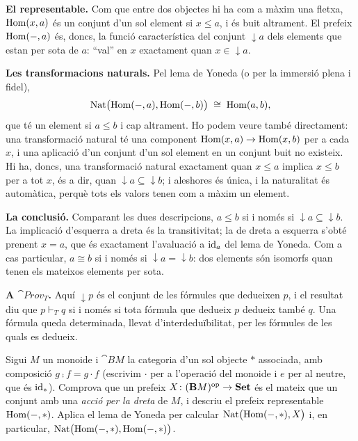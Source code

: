 \begin{solucio}
\textbf{El representable.} Com que entre dos objectes hi ha com a màxim una fletxa, $\operatorname{Hom}(x,a)$ és un conjunt d'un sol element si $x\le a$, i és buit altrament. El prefeix $\operatorname{Hom}(-,a)$ és, doncs, la funció característica del conjunt ${\downarrow}a$ dels elements que estan per sota de $a$: \enquote{val} en $x$ exactament quan $x\in{\downarrow}a$.

\textbf{Les transformacions naturals.} Pel lema de Yoneda (o per la immersió plena i fidel),
\[
\operatorname{Nat}\bigl(\operatorname{Hom}(-,a),\operatorname{Hom}(-,b)\bigr)\;\cong\;\operatorname{Hom}(a,b),
\]
que té un element si $a\le b$ i cap altrament. Ho podem veure també directament: una transformació natural té una component $\operatorname{Hom}(x,a)\to\operatorname{Hom}(x,b)$ per a cada $x$, i una aplicació d'un conjunt d'un sol element en un conjunt buit no existeix. Hi ha, doncs, una transformació natural exactament quan $x\le a$ implica $x\le b$ per a tot $x$, és a dir, quan ${\downarrow}a\subseteq{\downarrow}b$; i aleshores és única, i la naturalitat és automàtica, perquè tots els valors tenen com a màxim un element.

\textbf{La conclusió.} Comparant les dues descripcions, $a\le b$ si i només si ${\downarrow}a\subseteq{\downarrow}b$. La implicació d'esquerra a dreta és la transitivitat; la de dreta a esquerra s'obté prenent $x=a$, que és exactament l'avaluació a $\operatorname{id}_a$ del lema de Yoneda. Com a cas particular, $a\cong b$ si i només si ${\downarrow}a={\downarrow}b$: dos elements són isomorfs quan tenen els mateixos elements per sota.

\textbf{A $\cat{Prov}_T$.} Aquí ${\downarrow}p$ és el conjunt de les fórmules que dedueixen $p$, i el resultat diu que $p\vdash_T q$ si i només si tota fórmula que dedueix $p$ dedueix també $q$. Una fórmula queda determinada, llevat d'interdeduïbilitat, per les fórmules de les quals es dedueix.
\end{solucio}

\begin{exercici}\label{pr-yoneda-monoide}
Sigui $M$ un monoide i $\cat{B}M$ la categoria d'un sol objecte $\ast$ associada, amb composició $g\comp f=g\cdot f$ (escrivim $\cdot$ per a l'operació del monoide i $e$ per al neutre, que és $\operatorname{id}_\ast$). Comprova que un prefeix $X\colon(\mathbf{B}M)^{\mathrm{op}}\to\mathbf{Set}$ és el mateix que un conjunt amb una \emph{acció per la dreta} de $M$, i descriu el prefeix representable $\operatorname{Hom}(-,\ast)$. Aplica el lema de Yoneda per calcular $\operatorname{Nat}\bigl(\operatorname{Hom}(-,\ast),X\bigr)$ i, en particular, $\operatorname{Nat}\bigl(\operatorname{Hom}(-,\ast),\operatorname{Hom}(-,\ast)\bigr)$.
\end{exercici}

